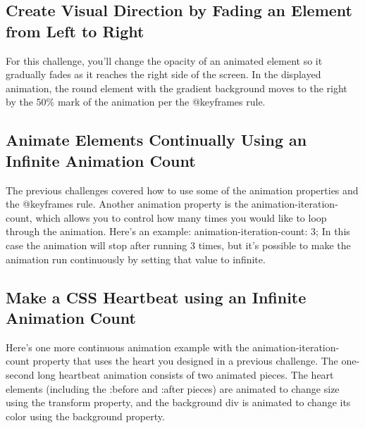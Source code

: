 \documentclass{article}%
\begin{document}
%
\subsection{Create Visual Direction by Fading an Element from Left to Right}%
\label{subsec:CreateVisualDirectionbyFadinganElementfromLefttoRight}%
For this challenge, you'll change the opacity of an animated element so it gradually fades as it reaches the right side of the screen.\newline%
In the displayed animation, the round element with the gradient background moves to the right by the 50\% mark of the animation per the @keyframes rule.\newline%

%
\subsection{Animate Elements Continually Using an Infinite Animation Count}%
\label{subsec:AnimateElementsContinuallyUsinganInfiniteAnimationCount}%
The previous challenges covered how to use some of the animation properties and the @keyframes rule. Another animation property is the animation{-}iteration{-}count, which allows you to control how many times you would like to loop through the animation. Here's an example:\newline%
animation{-}iteration{-}count: 3;\newline%
In this case the animation will stop after running 3 times, but it's possible to make the animation run continuously by setting that value to infinite.\newline%

%
\subsection{Make a CSS Heartbeat using an Infinite Animation Count}%
\label{subsec:MakeaCSSHeartbeatusinganInfiniteAnimationCount}%
Here's one more continuous animation example with the animation{-}iteration{-}count property that uses the heart you designed in a previous challenge.\newline%
The one{-}second long heartbeat animation consists of two animated pieces. The heart elements (including the :before and :after pieces) are animated to change size using the transform property, and the background div is animated to change its color using the background property.\newline%

%
\end{document}
